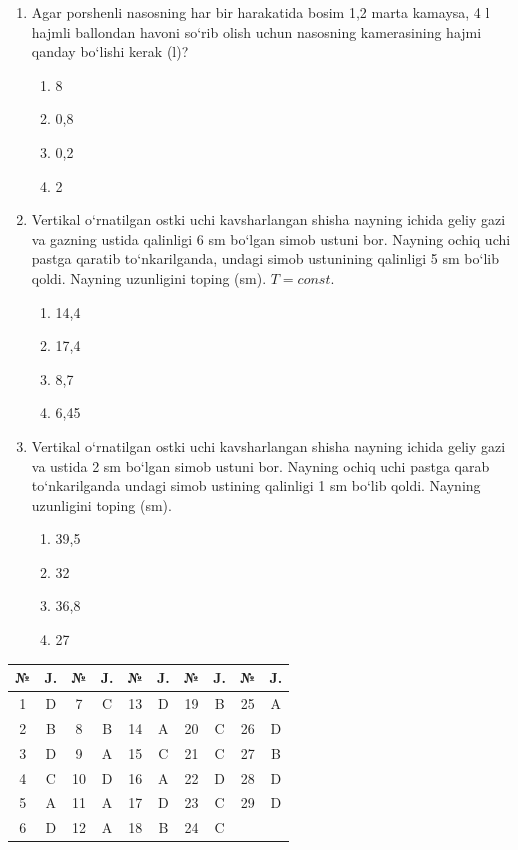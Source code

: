 \begin{enumerate}
\item Agar porshenli nasosning har bir harakatida bosim 1,2 marta kamaysa, 4 l hajmli ballondan havoni so‘rib olish uchun nasosning kamerasining hajmi qanday bo‘lishi kerak (l)?
\begin{enumerate}[label=\Alph*)]
\item 8
\item 0,8
\item 0,2
\item 2
\end{enumerate}

\item Vertikal o‘rnatilgan ostki uchi kavsharlangan shisha nayning ichida geliy gazi va gazning ustida qalinligi 6 sm bo‘lgan simob ustuni bor. Nayning ochiq uchi pastga qaratib to‘nkarilganda, undagi simob ustunining qalinligi 5 sm bo‘lib qoldi. Nayning uzunligini toping (sm). $T = const$.
\begin{enumerate}[label=\Alph*)]
\item 14,4
\item 17,4
\item 8,7
\item 6,45
\end{enumerate}

\item Vertikal o‘rnatilgan ostki uchi kavsharlangan shisha nayning ichida geliy gazi va ustida 2 sm bo‘lgan simob ustuni bor. Nayning ochiq uchi pastga qarab to‘nkarilganda undagi simob ustining qalinligi 1 sm bo‘lib qoldi. Nayning uzunligini toping (sm).
\begin{enumerate}[label=\Alph*)]
\item 39,5
\item 32
\item 36,8
\item 27
\end{enumerate}

\end{enumerate}



\begin{table}[h!]
\centering
\begin{tabular}{|c|c|c|c|c|c|c|c|c|c|}
\hline
№ & J. & № & J. & № & J. & № & J. & № & J. \\ \hline
1 & D & 7 & C & 13 & D & 19 & B & 25 & A \\ \hline
2 & B & 8 & B & 14 & A & 20 & C & 26 & D \\ \hline
3 & D & 9 & A & 15 & C & 21 & C & 27 & B \\ \hline
4 & C & 10 & D & 16 & A & 22 & D & 28 & D \\ \hline
5 & A & 11 & A & 17 & D & 23 & C & 29 & D \\ \hline
6 & D & 12 & A & 18 & B & 24 & C & & \\ \hline
\end{tabular}
\end{table}